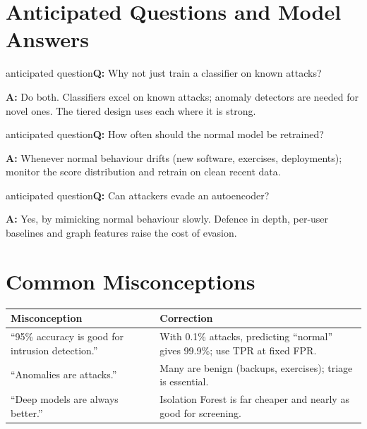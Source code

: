\documentclass[11pt]{article}
\begin{document}
\section{Anticipated Questions and Model Answers}

\begin{question}{anticipated question}\textbf{Q:} Why not just train a classifier on known attacks?\par\smallskip\textbf{A:} Do both. Classifiers excel on known attacks; anomaly detectors are needed for novel ones. The tiered design uses each where it is strong.\end{question}

\begin{question}{anticipated question}\textbf{Q:} How often should the normal model be retrained?\par\smallskip\textbf{A:} Whenever normal behaviour drifts (new software, exercises, deployments); monitor the score distribution and retrain on clean recent data.\end{question}

\begin{question}{anticipated question}\textbf{Q:} Can attackers evade an autoencoder?\par\smallskip\textbf{A:} Yes, by mimicking normal behaviour slowly. Defence in depth, per-user baselines and graph features raise the cost of evasion.\end{question}

\section{Common Misconceptions}\begin{center}\small\renewcommand{\arraystretch}{1.35}\begin{tabularx}{\textwidth}{@{}>{\raggedright\arraybackslash}X >{\raggedright\arraybackslash}X@{}}\toprule\textbf{Misconception} & \textbf{Correction}\\\midrule``95\% accuracy is good for intrusion detection.'' & With 0.1\% attacks, predicting ``normal'' gives 99.9\%; use TPR at fixed FPR.\\
``Anomalies are attacks.'' & Many are benign (backups, exercises); triage is essential.\\
``Deep models are always better.'' & Isolation Forest is far cheaper and nearly as good for screening.\\\bottomrule\end{tabularx}\end{center}
\end{document}
